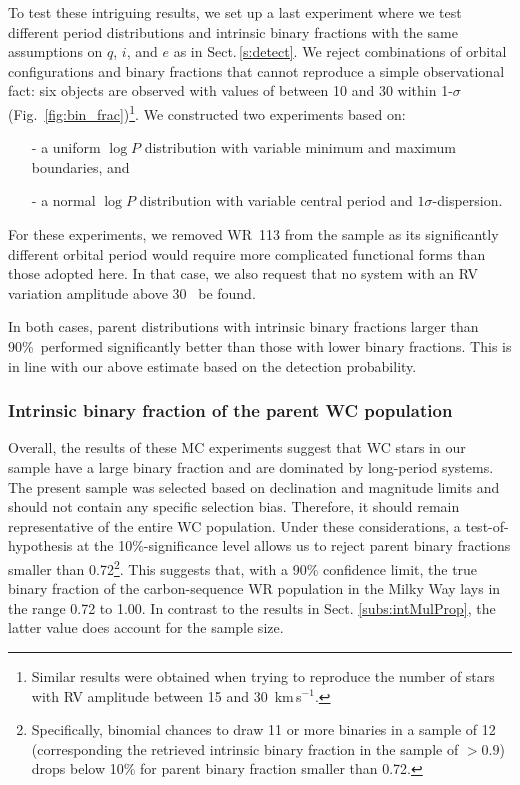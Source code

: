 To test these intriguing results, we set up a last experiment where we test different period distributions and intrinsic binary fractions with the same assumptions on $q$, $i$, and $e$ as in Sect.\,\ref{s:detect}. We reject combinations of orbital configurations and binary fractions that cannot reproduce a simple observational fact: six objects are observed with values of \DelRV{} between 10 and 30 \kms{} within 1-$\sigma$ (Fig.~\ref{fig:bin_frac})\footnote{Similar results were obtained when trying to reproduce the number of stars with RV amplitude between 15 and 30~km\,s$^{-1}$.}. We constructed two experiments based on: 
\begin{enumerate}
    \item[-] a uniform $\log P$ distribution with variable minimum and maximum boundaries, and
    \item[-] a normal $\log P$ distribution with variable central period and $1\sigma$-dispersion.
\end{enumerate} 
For these experiments, we removed WR~113 from the sample as its significantly different orbital period would require more complicated functional forms than those adopted here. In that case, we also request that no system with an RV variation amplitude above 30~\kms{} be found.

In both cases, parent distributions with intrinsic binary fractions larger than 90\%\ performed significantly better than those with lower binary fractions. This is in line with our above estimate based on the detection probability. 

\subsubsection{Intrinsic binary fraction of the parent WC population}
Overall, the results of these MC experiments suggest that WC stars in our sample have a large binary fraction and are dominated by long-period systems. The present sample was selected based on declination and magnitude limits and should not contain any specific selection bias. Therefore, it should remain representative of the entire WC population. Under these considerations, a test-of-hypothesis at the 10\%-significance level allows us to reject parent binary fractions smaller than 0.72\footnote{Specifically, binomial chances to draw 11 or more binaries in a sample of 12 (corresponding the retrieved intrinsic binary fraction in the sample of $>0.9$) drops below 10\% for parent binary fraction smaller than 0.72.}. This suggests that, with a 90\% confidence limit, the true binary fraction of the carbon-sequence WR population in the Milky Way lays in the range 0.72 to 1.00. In contrast to the results in Sect. \ref{subs:intMulProp}, the latter value does account for the sample size.
